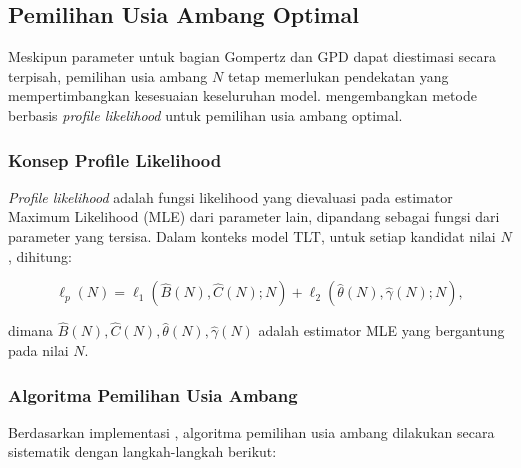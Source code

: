 \subsection{Pemilihan Usia Ambang Optimal}

Meskipun parameter untuk bagian Gompertz dan GPD dapat diestimasi secara terpisah, pemilihan usia ambang $N$ tetap memerlukan pendekatan yang mempertimbangkan kesesuaian keseluruhan model. \citet{li2008threshold} mengembangkan metode berbasis \textit{profile likelihood} untuk pemilihan usia ambang optimal.

\subsubsection{Konsep Profile Likelihood}

\textit{Profile likelihood} adalah fungsi likelihood yang dievaluasi pada estimator Maximum Likelihood (MLE) dari parameter lain, dipandang sebagai fungsi dari parameter yang tersisa. Dalam konteks model TLT, untuk setiap kandidat nilai $N$, dihitung:

\begin{equation}
\ell_p(N) = \ell_1(\hat{B}(N), \hat{C}(N); N) + \ell_2(\hat{\theta}(N), \hat{\gamma}(N); N),
\label{eq:profile_likelihood}
\end{equation}

dimana $\hat{B}(N), \hat{C}(N), \hat{\theta}(N), \hat{\gamma}(N)$ adalah estimator MLE yang bergantung pada nilai $N$.

\subsubsection{Algoritma Pemilihan Usia Ambang}

Berdasarkan implementasi \citet{li2008threshold}, algoritma pemilihan usia ambang dilakukan secara sistematik dengan langkah-langkah berikut:

